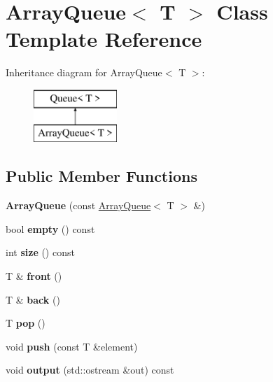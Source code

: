 \hypertarget{classArrayQueue}{}\section{Array\+Queue$<$ T $>$ Class Template Reference}
\label{classArrayQueue}
Inheritance diagram for Array\+Queue$<$ T $>$\+:\begin{figure}[H]
\begin{center}
\leavevmode
\includegraphics[height=2.000000cm]{classArrayQueue}
\end{center}
\end{figure}
\subsection*{Public Member Functions}
\begin{DoxyCompactItemize}
\item 
\mbox{\label{classArrayQueue_ab5b514bd3a1b12782349b4780c5a857e}} 
{\bfseries Array\+Queue} (const \hyperlink{classArrayQueue}{Array\+Queue}$<$ T $>$ \&)
\item 
\mbox{\label{classArrayQueue_a2781468de08c00f8f5fb4ccc1485605a}} 
bool {\bfseries empty} () const
\item 
\mbox{\label{classArrayQueue_ae75aad860a1c25ddb43945365d0ecfe1}} 
int {\bfseries size} () const
\item 
\mbox{\label{classArrayQueue_ad9be350fa69111973f9adc1f357330e6}} 
T \& {\bfseries front} ()
\item 
\mbox{\label{classArrayQueue_a98b5d50c5b7c8f9ae342bb1a4b39f1ad}} 
T \& {\bfseries back} ()
\item 
\mbox{\label{classArrayQueue_a2963c72eb08fea6a71561ad2b50cacab}} 
T {\bfseries pop} ()
\item 
\mbox{\label{classArrayQueue_a47169b6217833d23957a5d34f72cdb2b}} 
void {\bfseries push} (const T \&element)
\item 
\mbox{\label{classArrayQueue_a266966b8e1d1ec4f9086194df996a1d4}} 
void {\bfseries output} (std\+::ostream \&out) const
\end{DoxyCompactItemize}
